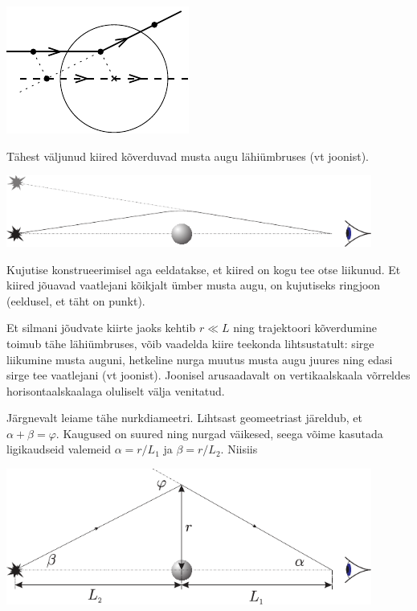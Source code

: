 \documentclass[10pt]{article}
\begin{document}
{\begin{center}
	\includegraphics[width=0.5\linewidth]{2011-v2g-10-lah}
\end{center}
\probend
\bigskip


\solu
Tähest väljunud kiired kõverduvad musta augu lähiümbruses (vt joonist). 

\begin{center}
	\includegraphics[width=0.9\textwidth]{2007-v2g-10-lah1}
\end{center}

Kujutise konstrueerimisel aga eeldatakse, et kiired on kogu tee otse liikunud. Et kiired jõuavad vaatlejani kõikjalt ümber musta augu, on kujutiseks ringjoon (eeldusel, et täht on punkt).

Et silmani jõudvate kiirte jaoks kehtib $r \ll L$ ning trajektoori kõverdumine toimub tähe lähiümbruses, võib vaadelda kiire teekonda lihtsustatult: sirge liikumine musta auguni, hetkeline nurga muutus musta augu juures ning edasi sirge tee vaatlejani (vt joonist). Joonisel arusaadavalt on vertikaalskaala võrreldes horisontaalskaalaga oluliselt välja venitatud.

Järgnevalt leiame tähe nurkdiameetri. Lihtsast geomeetriast järeldub, et $\alpha + \beta = \varphi$. Kaugused on suured ning nurgad väikesed, seega võime kasutada ligikaudseid valemeid $\alpha = r/L_1$ ja $\beta = r/L_2$. Niisiis

\begin{center}
	\includegraphics[width=0.9\textwidth]{2007-v2g-10-lah2}
\end{center}

}
\end{document}
